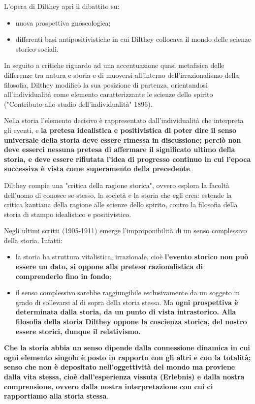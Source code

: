 L'opera di Dilthey aprì il dibattito su:

\begin{itemize}
	\item nuova prospettiva gnoseologica;
	\item differenti basi antipositivistiche  in cui Dilthey collocava il mondo delle scienze storico-sociali.
\end{itemize}  

In seguito a critiche riguardo ad una accentuazione quasi metafisica delle differenze tra natura e storia e di muoversi all'interno dell'irrazionalismo della filosofia, Dilthey modificò la sua posizione di partenza, orientandosi all'individualità come elemento caratterizzante le scienze dello spirito ("Contributo allo studio dell'individualità" 1896).

Nella storia l'elemento decisivo è rappresentato dall'individualità che interpreta gli eventi, e \textbf{la pretesa idealistica e positivistica di poter dire il senso universale della storia deve essere rimessa in discussione; perciò non deve esserci nessuna pretesa di affermare il significato ultimo della storia, e deve essere rifiutata l'idea di progresso continuo in cui l'epoca successiva è vista come superamento della precedente}.

Dilthey compie una "critica della ragione storica", ovvero esplora la facoltà dell'uomo di conosce se stesso, la società e la storia che egli crea: estende la critica kantiana della ragione alle scienze dello spirito, contro la filosofia della storia di stampo idealistico e positivistico.

Negli ultimi scritti (1905-1911) emerge l'improponibilità di un senso complessivo della storia. Infatti:

\begin{itemize}
	\item la storia ha struttura vitalistica, irrazionale, cioè \textbf{l'evento storico non può essere un dato, si oppone alla pretesa razionalistica di comprenderlo fino in fondo};
	\item il senso complessivo sarebbe raggiungibile esclusivamente da un soggeto in grado di sollevarsi al di sopra della storia stessa. Ma \textbf{ogni prospettiva è determinata dalla storia, da un punto di vista intrastorico. Alla filosofia della storia Dilthey oppone la coscienza storica, del nostro essere storici, dunque il relativismo.}
\end{itemize} 

\textbf{Che la storia abbia un senso dipende dalla connessione dinamica in cui ogni elemento singolo è posto in rapporto con gli altri e con la totalità; senso che non è depositato nell'oggettività del mondo ma proviene dalla vita stessa, cioè dall'esperienza vissuta (Erlebnis) e dalla nostra comprensione, ovvero dalla nostra interpretazione con cui ci rapportiamo alla storia stessa}.

